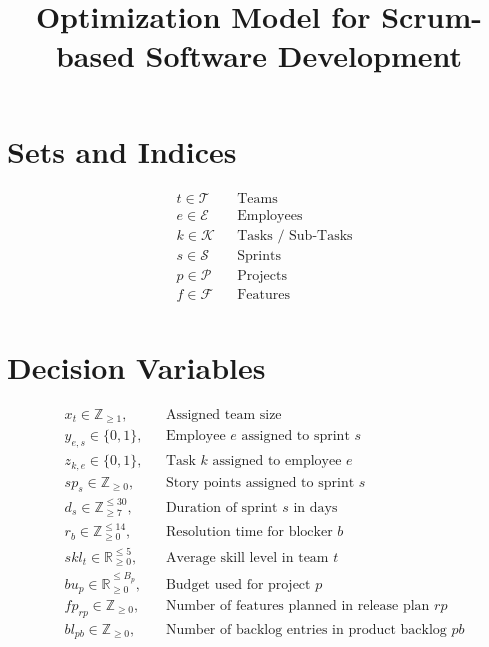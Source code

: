 \documentclass{article}
\begin{document}
\title{Optimization Model for Scrum-based Software Development}
\author{}
\date{}
\maketitle

\section*{Sets and Indices}
\begin{align*}
    & t \in \mathcal{T} && \text{Teams} \\
    & e \in \mathcal{E} && \text{Employees} \\
    & k \in \mathcal{K} && \text{Tasks / Sub-Tasks} \\
    & s \in \mathcal{S} && \text{Sprints} \\
    & p \in \mathcal{P} && \text{Projects} \\
    & f \in \mathcal{F} && \text{Features} \\
\end{align*}

\section*{Decision Variables}
\begin{align*}
    & x_{t} \in \mathbb{Z}_{\geq 1}, && \text{Assigned team size} \\
    & y_{e,s} \in \{0,1\}, && \text{Employee } e \text{ assigned to sprint } s \\
    & z_{k,e} \in \{0,1\}, && \text{Task } k \text{ assigned to employee } e \\
    & sp_{s} \in \mathbb{Z}_{\geq 0}, && \text{Story points assigned to sprint } s \\
    & d_{s} \in \mathbb{Z}_{\geq 7}^{\leq 30}, && \text{Duration of sprint } s \text{ in days} \\
    & r_{b} \in \mathbb{Z}_{\geq 0}^{\leq 14}, && \text{Resolution time for blocker } b \\
    & skl_{t} \in \mathbb{R}_{\geq 0}^{\leq 5}, && \text{Average skill level in team } t \\
    & bu_{p} \in \mathbb{R}_{\geq 0}^{\leq B_p}, && \text{Budget used for project } p \\
    & fp_{rp} \in \mathbb{Z}_{\geq 0}, && \text{Number of features planned in release plan } rp \\
    & bl_{pb} \in \mathbb{Z}_{\geq 0}, && \text{Number of backlog entries in product backlog } pb \\
\end{align*}
\end{document}
